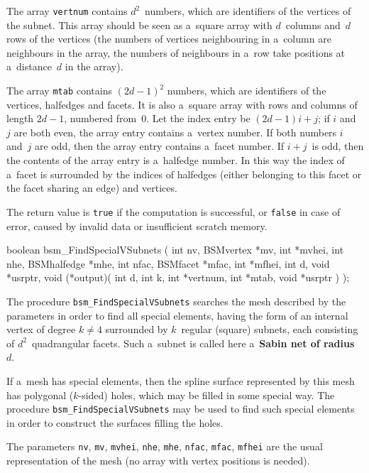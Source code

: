 The array \texttt{vertnum} contains $d^2$~numbers, which are identifiers of
the vertices of the subnet. This array should be seen as a~square array with
$d$~columns and~$d$ rows of the vertices (the numbers of vertices neighbouring
in a~column are neighbours in the array, the numbers of neighbours in a~row
take positions at a~distance~$d$ in the array).

The array \texttt{mtab} contains $(2d-1)^2$ numbers, which are identifiers
of the vertices, halfedges and facets. It is also a~square array with rows
and columns of length $2d-1$, numbered from~$0$. Let the index entry be
$(2d-1)i+j$; if $i$ and~$j$ are both even, the array entry contains a~vertex
number. If both numbers $i$ and~$j$ are odd, then the array entry contains
a~facet number. If $i+j$~is odd, then the contents of the array entry is
a~halfedge number. In this way the index of a~facet is surrounded by the
indices of halfedges (either belonging to this facet or the facet sharing an
edge) and vertices.

The return value is \texttt{true} if the computation is successful, or
\texttt{false} in case of error, caused by invalid data or insufficient
scratch memory.

\medskip
\begin{listingC}
boolean bsm_FindSpecialVSubnets ( int nv, BSMvertex *mv, int *mvhei,
                          int nhe, BSMhalfedge *mhe,
                          int nfac, BSMfacet *mfac, int *mfhei,
                          int d, void *usrptr,
                          void (*output)( int d, int k, int *vertnum,
                                          int *mtab, void *usrptr ) );
\end{listingC}
The procedure \texttt{bsm\_FindSpecialVSubnets} searches the mesh described
by the parameters in order to find all special elements, having the form of an
internal vertex of degree $k\neq 4$ surrounded by $k$~regular (square)
subnets, each consisting of $d^2$~quadrangular facets. Such a~subnet is
called here a~\textbf{Sabin net of radius~$d$}.

If a~mesh has special elements, then the spline surface represented by this
mesh has polygonal ($k$-sided) holes, which may be filled in some special
way. The procedure \texttt{bsm\_FindSpecialVSubnets} may be used to find
such special elements in order to construct the surfaces filling the holes.

The parameters \texttt{nv}, \texttt{mv}, \texttt{mvhei}, \texttt{nhe},
\texttt{mhe}, \texttt{nfac}, \texttt{mfac}, \texttt{mfhei} are the usual
representation of the mesh (no array with vertex positions is needed).

